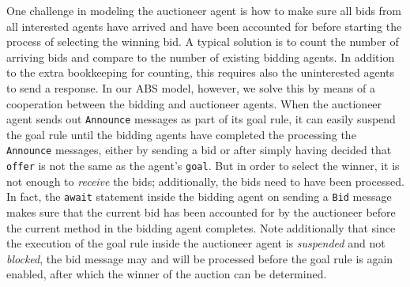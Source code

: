 One challenge in modeling the auctioneer agent is how to make sure all bids from all interested agents have arrived and have been accounted for before starting the process of selecting the winning bid. 
A typical solution is to count the number of arriving bids and compare to the number of existing bidding agents. 
In addition to the extra bookkeeping for counting, this requires also the uninterested agents to send a response. 
In our ABS model, however, we solve this by means of a cooperation between the bidding and auctioneer agents.
When the auctioneer agent sends out \lstinline|Announce| messages as part of its goal rule, it can easily suspend the goal rule until the bidding agents have completed the processing the \lstinline|Announce| messages, either by sending a bid or after simply having decided that \lstinline|offer| is not the same as the agent's \lstinline|goal|.
But in order to select the winner, it is not enough to {\em receive} the bids; additionally, the bids need to have been processed.
In fact, the \lstinline|await| statement inside the bidding agent on sending a \lstinline|Bid| message makes sure that the current bid has been accounted for by the auctioneer before the current method in the bidding agent completes. 
Note additionally that since the execution of the goal rule inside the auctioneer agent is {\em suspended} and not {\em blocked}, the bid message may and will be processed before the goal rule is again enabled, after which the winner of the auction can be determined.
